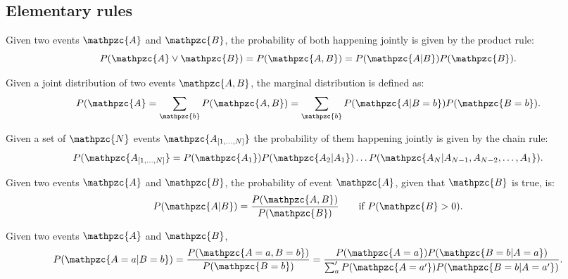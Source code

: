 \subsection{Elementary rules}
\begin{definition}
Given two events $\mathpzc{A}$ and $\mathpzc{B}$, the probability of both happening jointly is given by the product rule: $$P(\mathpzc{A}\vee\mathpzc{B})=P(\mathpzc{A,B})=P(\mathpzc{A|B})P(\mathpzc{B}).$$
\end{definition}
\begin{definition}
Given a joint distribution of two events $\mathpzc{A,B}$, the marginal distribution is defined as: $$P(\mathpzc{A}=\sum_\mathpzc{b} P(\mathpzc{A,B})=\sum_\mathpzc{b} P(\mathpzc{A|B=b})P(\mathpzc{B=b}).$$
\end{definition}
\begin{definition}
Given a set of $\mathpzc{N}$ events $\mathpzc{A_{[1,\ldots,N]}}$ the probability of them happening jointly is given by the chain rule: $$P(\mathpzc{A_{[1,\ldots,N]}}=P(\mathpzc{A_1})P(\mathpzc{A_2|A_1})\ldots P(\mathpzc{A_N|A_{N-1},A_{N-2},\ldots,A_1}).$$
\end{definition}
\begin{definition}
Given two events $\mathpzc{A}$ and $\mathpzc{B}$, the probability of event $\mathpzc{A}$, given that $\mathpzc{B}$ is true, is: $$P(\mathpzc{A|B})=\frac{P(\mathpzc{A,B})}{P(\mathpzc{B})}\qquad\text{if }P(\mathpzc{B}>0).$$
\end{definition}
\begin{definition}
Given two events $\mathpzc{A}$ and $\mathpzc{B}$, $$P(\mathpzc{A=a|B=b})=\frac{P(\mathpzc{A=a,B=b})}{P(\mathpzc{B=b})}=\frac{P(\mathpzc{A=a})P(\mathpzc{B=b|A=a})}{\sum_a'P(\mathpzc{A=a'})P(\mathpzc{B=b|A=a'})}.$$
\end{definition}
